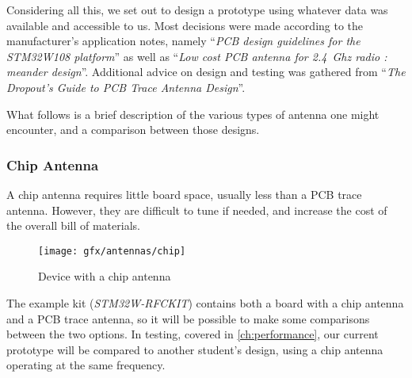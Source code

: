 Considering all this, we set out to design a prototype using whatever data was
available and accessible to us. Most decisions were made according to the
manufacturer's application notes, namely ``\emph{PCB design guidelines for the
STM32W108 platform}''\citep{AN3206} as well as ``\emph{Low cost PCB antenna for
\SI{2.4}{Ghz} radio : meander design}''\citep{AN3359}. Additional advice on
design and testing was gathered from ``\emph{The Dropout's Guide to PCB Trace
Antenna Design}''\citep{DropoutGuide}. 

What follows is a brief description of the various types of antenna one might
encounter, and a comparison between those designs. 


\subsubsection{Chip Antenna}

A chip antenna requires little board space, usually less than a PCB trace
antenna.\citep{slyt296} However, they are difficult to tune if
needed\citep{DropoutGuide}, and increase the cost of the overall bill of
materials.

\begin{figure}[bth]
  \begin{center}
    \texttt{[image: gfx/antennas/chip]}
  \end{center}
  \caption{Device with a chip antenna}
  \label{fig:chip-antenna}
\end{figure}

The example kit (\emph{STM32W-RFCKIT}) contains both a board with a chip antenna
and a PCB trace antenna, so it will be possible to make some comparisons between
the two options. In testing, covered in \autoref{ch:performance}, our current
prototype will be compared to another student's design, using a chip antenna
operating at the same frequency.

